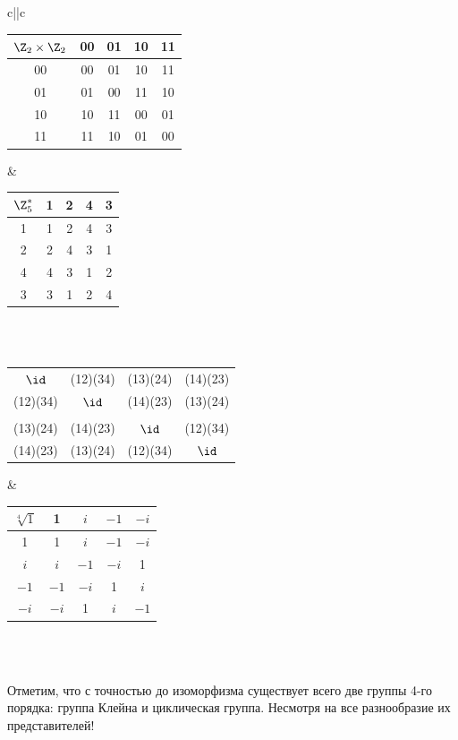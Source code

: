 \begin{enumerate}
\begin{table}[h!]
\begin{tabular}{c||c}
\\


\begin{tabular}{c|cccc}
$\Z_2\times\Z_2$ & 00 & 01 & 10 & 11\\  \hline
00 & 00 & 01 & 10 & 11 \\
01 & 01 & 00 & 11 & 10 \\
10 & 10 & 11 & 00 & 01 \\
11 & 11 & 10 & 01 & 00
\end{tabular}
 &
\begin{tabular}{c|cccc}
$\Z_5^*$ & 1 & 2 & 4 & 3 \\  \hline
1 & 1 & 2 & 4 & 3 \\
2 & 2 & 4 & 3 & 1\\
4 & 4 & 3 & 1 & 2\\
3 & 3 & 1 & 2 & 4
\end{tabular}
\\
\\

\footnotesize %
\begin{tabular}{cc|cc}
 $\id$    & (12)(34) & (13)(24) & (14)(23) \\[5pt]
 (12)(34) & $\id$    & (14)(23) & (13)(24) \\[3pt]\hline
 &&& \\[-5pt]
 (13)(24) & (14)(23) & $\id$    & (12)(34) \\[5pt]
 (14)(23) & (13)(24) & (12)(34) & $\id$
\end{tabular}
 &
\begin{tabular}{c|cccc}
$\sqrt[4]{1}$ & 1    & $i$  & $-1$ & $-i$ \\  \hline
1             & 1    & $i$  & $-1$ & $-i$ \\
$i$           & $i$  & $-1$ & $-i$ & 1    \\
$-1$          & $-1$ & $-i$ & 1    & $i$  \\
$-i$          & $-i$ & 1    & $i$  & $-1$
\end{tabular}
\\
\\

\hline

\end{tabular}
\end{table}

Отметим, что с точностью до изоморфизма существует всего две группы 4-го порядка: группа Клейна и циклическая группа. Несмотря на все разнообразие их представителей!





\end{enumerate}
